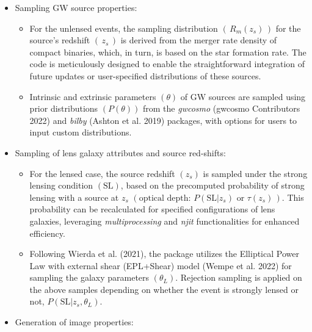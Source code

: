 \documentclass[10pt,a4paper,onecolumn]{article}
\providecommand{\tightlist}{%
  \setlength{\itemsep}{0pt}\setlength{\parskip}{0pt}}
\begin{document}
\begin{itemize}
\tightlist
\item
  Sampling GW source properties:

  \begin{itemize}
  \tightlist
  \item
    For the unlensed events, the sampling distribution
    \((\,R_m(z_s)\,)\) for the source's redshift \((\,z_s\,)\) is
    derived from the merger rate density of compact binaries, which, in
    turn, is based on the star formation rate. The code is meticulously
    designed to enable the straightforward integration of future updates
    or user-specified distributions of these sources.
  \item
    Intrinsic and extrinsic parameters \((\theta)\) of GW sources are
    sampled using prior distributions \((P(\theta))\) from the
    \emph{gwcosmo} (gwcosmo Contributors 2022) and \emph{bilby} (Ashton
    et al. 2019) packages, with options for users to input custom
    distributions.
  \end{itemize}
\item
  Sampling of lens galaxy attributes and source red-shifts:

  \begin{itemize}
  \tightlist
  \item
    For the lensed case, the source redshift \((z_s)\) is sampled under
    the strong lensing condition \((\text{SL})\), based on the
    precomputed probability of strong lensing with a source at \(z_s\)
    \((\text{optical depth: }P\left(\text{SL}|z_s\right) \text{ or }\tau(z_s)\,)\).
    This probability can be recalculated for specified configurations of
    lens galaxies, leveraging \emph{multiprocessing} and \emph{njit}
    functionalities for enhanced efficiency.
  \item
    Following Wierda et al. (2021), the package utilizes the Elliptical
    Power Law with external shear (EPL+Shear) model (Wempe et al. 2022)
    for sampling the galaxy parameters \((\theta_L)\). Rejection
    sampling is applied on the above samples depending on whether the
    event is strongly lensed or not,
    \(P\left(\text{SL}|z_s,\theta_L\right)\).
  \end{itemize}
\item
  Generation of image properties:


\end{itemize}
\end{document}
